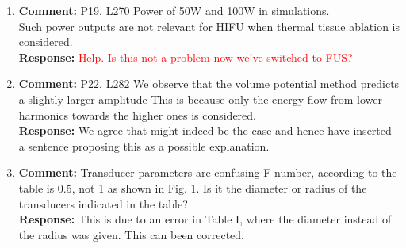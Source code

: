 \documentclass[11pt]{article}
\begin{document}
\begin{enumerate}
	\item \textbf{Comment:} P19, L270 Power of 50W and 100W in simulations. \\
	Such power outputs are not relevant for HIFU when thermal tissue ablation is considered. \\
	\textbf{Response:} \textcolor{red}{Help. Is this not a problem now we've switched to FUS?}
 
	\item \textbf{Comment:} P22, L282 We observe that the volume potential method predicts a slightly larger amplitude
	This is because only the energy flow from lower harmonics towards the higher ones is considered.\\
	\textbf{Response:} We agree that might indeed be the case and hence have inserted a sentence
	proposing this as a possible explanation.
	
	\item \textbf{Comment:} Transducer parameters are confusing F-number, according to the table is 0.5, not 1 as shown in Fig. 1.
	Is it the diameter or radius of the transducers indicated in the table? \\
	\textbf{Response:} This is due to an error in Table I, where the diameter instead 
	of the radius was given. This can been corrected.
\end{enumerate}
\end{document}
